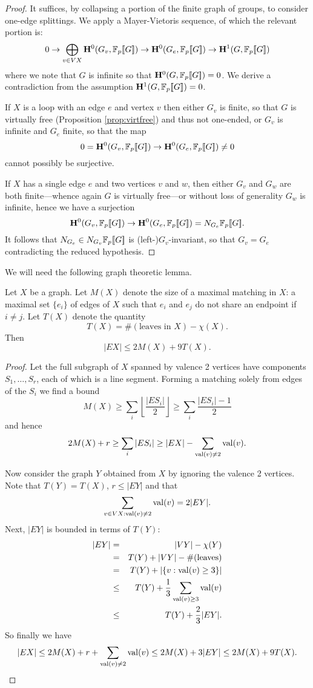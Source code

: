 \documentclass[draft, a4paper]{article}
\begin{document}
\begin{proof}
It suffices, by collapsing \cite[Proposition 2.8]{Wilkes19} a portion of the finite graph of groups, to consider one-edge splittings.  We apply a Mayer-Vietoris sequence, of which the relevant portion is:
\[0 \to \bigoplus_{v\in VX} {\bf H}^0(G_v,{\mathbb{F}_p[\![G]\!]}) \to {\bf H}^0(G_e,{\mathbb{F}_p[\![G]\!]}) \to {\bf H}^1(G,{\mathbb{F}_p[\![G]\!]}) \]
where we note that $G$ is infinite so that ${\bf H}^0(G,{\mathbb{F}_p[\![G]\!]})=0$. We derive a contradiction from the assumption ${\bf H}^1(G,{\mathbb{F}_p[\![G]\!]})= 0$. 

If $X$ is a loop with an edge $e$ and vertex $v$ then either $G_v$ is finite, so that $G$ is virtually free (Proposition \ref{prop:virtfree}) and thus not one-ended, or $G_v$ is infinite and $G_e$ finite, so that the map 
\[0={\bf H}^0(G_v,{\mathbb{F}_p[\![G]\!]}) \to {\bf H}^0(G_e,{\mathbb{F}_p[\![G]\!]})\neq 0\]
cannot possibly be surjective.

If $X$ has a single edge $e$ and two vertices $v$ and $w$, then either $G_v$ and $G_w$ are both finite---whence again $G$ is virtually free---or without loss of generality $G_w$ is infinite, hence we have a surjection
\[{\bf H}^0(G_v,{\mathbb{F}_p[\![G]\!]}) \to {\bf H}^0(G_e,{\mathbb{F}_p[\![G]\!]}) = N_{G_e}{\mathbb{F}_p[\![G]\!]}.\]
It follows that $N_{G_e} \in N_{G_v}{\mathbb{F}_p[\![G]\!]}$ is (left-)$G_v$-invariant, so that $G_v=G_e$ contradicting the reduced hypothesis.
\end{proof}
We will need the following graph theoretic lemma.
\begin{lem}\label{lem_counting} Let $X$ be a graph. Let $M(X)$ denote the size of a maximal matching in $X$: a maximal set $\{e_i\}$ of edges of $X$ such that $e_i$ and $e_j$ do not share an endpoint if $i\neq j$. Let $T(X)$ denote the quantity
\[T(X) = \#(\text{leaves in }X)  - \chi(X).\]
Then \[|EX| \leq 2M(X) + 9 T(X).\]
\end{lem}
\begin{proof}
Let the full subgraph of $X$ spanned by valence 2 vertices have components $S_1,\ldots, S_r$, each of which is a line segment. Forming a matching solely from edges of the $S_i$ we find a bound
\[M(X) \geq \sum_i \left\lfloor \frac{|ES_i|}{2}\right\rfloor \geq \sum_i \frac{|ES_i|-1}{2}\]
and hence
\[2M(X)+r\geq \sum_i |ES_i| \geq |EX| - \sum_{\operatorname{val}(v)\neq 2} \operatorname{val}(v).\]

Now consider the graph $Y$ obtained from $X$ by ignoring the valence 2 vertices. Note that $T(Y)=T(X)$, $r\leq |EY|$ and that 
\[\sum_{v\in VX : \operatorname{val}(v)\neq 2} \operatorname{val}(v) = 2 |EY|.\]
Next, $|EY|$ is bounded in terms of $T(Y)$:
\begin{eqnarray*}
|EY| & = & |VY| - \chi(Y)\\
&=& T(Y) + |VY| - \#(\text{leaves}) \\
&=& T(Y) + |\{v : \operatorname{val}(v)\geq 3\}|\\
&\leq & T(Y) +  \frac{1}{3}\sum_{\operatorname{val}(v)\geq 3} \operatorname{val}(v)\\
&\leq & T(Y) + \frac{2}{3} |EY|.
\end{eqnarray*}
So finally we have
\[|EX| \leq 2M(X)+r+\sum_{\operatorname{val}(v)\neq 2} \operatorname{val}(v)\leq 2M(X) + 3|EY|\leq 2M(X)+9T(X). \]
\end{proof}
\end{document}
